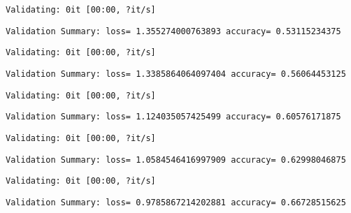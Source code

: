 \documentclass[11pt]{article}
\begin{document}
    
    \begin{Verbatim}[commandchars=\\\{\}]
Validating: 0it [00:00, ?it/s]
    \end{Verbatim}

    
    \begin{Verbatim}[commandchars=\\\{\}]
Validation Summary: loss= 1.355274000763893 accuracy= 0.53115234375
    \end{Verbatim}

    
    \begin{Verbatim}[commandchars=\\\{\}]
Validating: 0it [00:00, ?it/s]
    \end{Verbatim}

    
    \begin{Verbatim}[commandchars=\\\{\}]
Validation Summary: loss= 1.3385864064097404 accuracy= 0.56064453125
    \end{Verbatim}

    
    \begin{Verbatim}[commandchars=\\\{\}]
Validating: 0it [00:00, ?it/s]
    \end{Verbatim}

    
    \begin{Verbatim}[commandchars=\\\{\}]
Validation Summary: loss= 1.124035057425499 accuracy= 0.60576171875
    \end{Verbatim}

    
    \begin{Verbatim}[commandchars=\\\{\}]
Validating: 0it [00:00, ?it/s]
    \end{Verbatim}

    
    \begin{Verbatim}[commandchars=\\\{\}]
Validation Summary: loss= 1.0584546416997909 accuracy= 0.62998046875
    \end{Verbatim}

    
    \begin{Verbatim}[commandchars=\\\{\}]
Validating: 0it [00:00, ?it/s]
    \end{Verbatim}

    
    \begin{Verbatim}[commandchars=\\\{\}]
Validation Summary: loss= 0.9785867214202881 accuracy= 0.66728515625
    \end{Verbatim}
\end{document}
